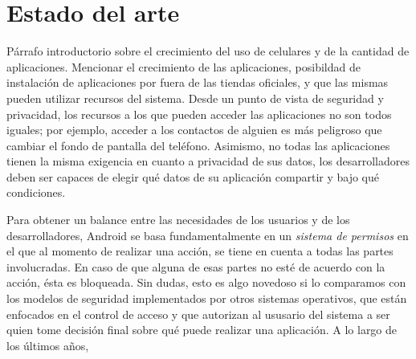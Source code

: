 
\chapter*{Estado del arte}
\label{chapter:estado}


Párrafo introductorio sobre el crecimiento del uso de celulares y de la cantidad
de aplicaciones. Mencionar el crecimiento de las aplicaciones, posibildad de
instalación de aplicaciones por fuera de las tiendas oficiales, y que las mismas
pueden utilizar recursos del sistema. Desde un punto de vista de seguridad y
privacidad, los recursos a los que pueden acceder las aplicaciones no son todos
iguales; por ejemplo, acceder a los contactos de alguien es más peligroso que
cambiar el fondo de pantalla del teléfono. Asimismo, no todas las aplicaciones
tienen la misma exigencia en cuanto a privacidad de sus datos, los
desarrolladores deben ser capaces de elegir qué datos de su aplicación compartir
y bajo qué condiciones.

Para obtener un balance entre las necesidades de los usuarios y de los
desarrolladores, Android se basa fundamentalmente en un \textit{sistema de
permisos} en el que al momento de realizar una acción, se tiene en cuenta a
todas las partes involucradas. En caso de que alguna de esas partes no esté de
acuerdo con la acción, ésta es bloqueada. Sin dudas, esto es algo novedoso si lo
comparamos con los modelos de seguridad implementados por otros sistemas
operativos, que están enfocados en el control de acceso y que autorizan al
ususario del sistema a ser quien tome decisión final sobre qué puede realizar una
aplicación.
A lo largo de los últimos años, 